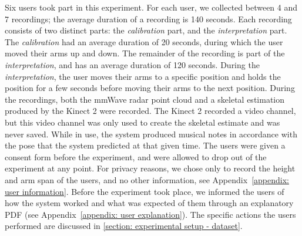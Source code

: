 
Six users took part in this experiment.
For each user, we collected between 4 and 7 recordings; the average duration of a recording is 140 seconds.
Each recording consists of two distinct parts: the \textit{calibration} part, and the \textit{interpretation} part.
The \textit{calibration} had an average duration of 20 seconds, during which the user moved their arms up and down. %
The remainder of the recording is part of the \textit{interpretation}, and has an average duration of 120 seconds.
During the \textit{interpretation}, the user moves their arms to a specific position and holds the position for a few seconds before moving their arms to the next position.
During the recordings, both the mmWave radar point cloud and a skeletal estimation produced by the Kinect 2 were recorded.
The Kinect 2 recorded a video channel, but this video channel was only used to create the skeletal estimate and was never saved.
While in use, the system produced musical notes in accordance with the pose that the system predicted at that given time.
The users were given a consent form before the experiment, and were allowed to drop out of the experiment at any point.
For privacy reasons, we chose only to record the height and arm span of the users, and no other information, see Appendix~\ref{appendix: user information}.
Before the experiment took place, we informed the users of how the system worked and what was expected of them through an explanatory PDF (see Appendix~\ref{appendix: user explanation}).
The specific actions the users performed are discussed in \cref{section: experimental setup - dataset}.

